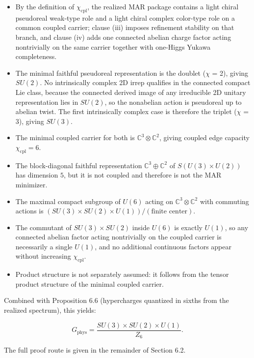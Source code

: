 \begin{itemize}
\tightlist
\item
  By the definition of \(\chi_{\mathrm{cpl}}\), the realized MAR package contains a light chiral pseudoreal weak-type role and a light chiral complex color-type role on a common coupled carrier; clause (iii) imposes refinement stability on that branch, and clause (iv) adds one connected abelian charge factor acting nontrivially on the same carrier together with one-Higgs Yukawa completeness.
\item
  The minimal faithful pseudoreal representation is the doublet (\ensuremath{\chi} = 2), giving \(SU(2)\). No intrinsically complex 2D irrep qualifies in the connected compact Lie class, because the connected derived image of any irreducible 2D unitary representation lies in \(SU(2)\), so the nonabelian action is pseudoreal up to abelian twist. The first intrinsically complex case is therefore the triplet (\ensuremath{\chi} = 3), giving \(SU(3)\).
\item
  The minimal coupled carrier for both is \(\mathbb{C}^3 \otimes \mathbb{C}^2\), giving coupled edge capacity \(\chi_{\mathrm{cpl}} = 6\).
\item
  The block-diagonal faithful representation \(\mathbb{C}^3 \oplus \mathbb{C}^2\) of \(S(U(3)\times U(2))\) has dimension \(5\), but it is not coupled and therefore is not the MAR minimizer.
\item
  The maximal compact subgroup of \(U(6)\) acting on \(\mathbb{C}^3 \otimes \mathbb{C}^2\) with commuting actions is \((SU(3) \times SU(2) \times U(1))/(\text{finite center})\).
\item
  The commutant of \(SU(3) \times SU(2)\) inside \(U(6)\) is exactly \(U(1)\), so any connected abelian factor acting nontrivially on the coupled carrier is necessarily a single \(U(1)\), and no additional continuous factors appear without increasing \(\chi_{\mathrm{cpl}}\).
\item
  Product structure is not separately assumed: it follows from the tensor product structure of the minimal coupled carrier.
\end{itemize}

Combined with Proposition 6.6 (hypercharges quantized in sixths from the realized spectrum), this yields:

\[
G_{\mathrm{phys}} = \frac{SU(3) \times SU(2) \times U(1)}{Z_6}.
\]

The full proof route is given in the remainder of Section 6.2.

